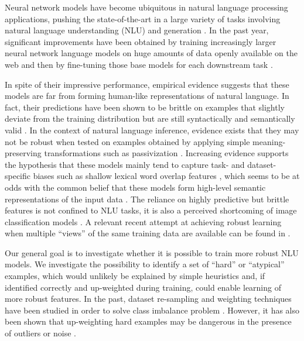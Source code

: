 
Neural network models have become ubiquitous in natural language processing applications, pushing the state-of-the-art in a large variety of tasks involving natural language understanding (NLU) and generation \cite{wu2016google,wang2019superglue}.
In the past year, significant improvements have been obtained by  training increasingly larger neural network language models on huge amounts of data openly available on the web and then by fine-tuning those base models for each downstream task \cite{devlin2018bert,peters2018deep,liu2019multi}.

In spite of their impressive performance, empirical evidence suggests that these models are far from forming human-like representations of natural language. In fact, their predictions have been shown to be brittle on examples that slightly deviate from the training distribution but are still syntactically and semantically valid \cite{jia2017adversarial,linzen2019right}. In the context of natural language inference, evidence exists that they may not be robust when tested on examples obtained by applying simple meaning-preserving transformations such as passivization \cite{dasgupta2018evaluating}.
Increasing evidence supports the hypothesis that these models mainly tend to capture task- and dataset-specific biases such as shallow lexical word overlap features \cite{poliak2018hypothesis,dasgupta2018evaluating,linzen2019right,clark2019dont}, which seems to be at odds with the common belief that these models form high-level semantic representations of the input data \cite{bengio2009learning}. The reliance on highly predictive but brittle features is not confined to NLU tasks, it is also a perceived shortcoming of image classification models \cite{brendel2019approximating,geirhos2018imagenet,jacobsen2018excessive}. A relevant recent attempt at achieving robust learning when multiple ``views'' of the same training data are available can be found in .

Our general goal is to investigate whether it is possible to train more robust NLU models. We investigate the possibility to identify a set of ``hard'' or ``atypical'' examples, which would unlikely be explained by simple heuristics and, if identified correctly and up-weighted during training, could enable learning of more robust features. In the past, dataset re-sampling and weighting techniques have been studied in order to solve class imbalance problem \cite{chawla2002smote}. However, it has also been shown that up-weighting hard examples may be dangerous in the presence of outliers or noise \cite{chapelle2007training,Kumar10,toneva2018empirical}.

